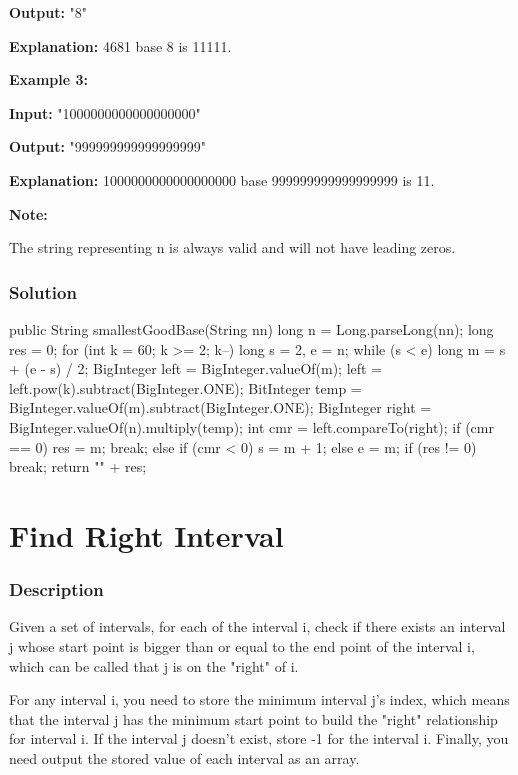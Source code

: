 \textbf{Output:} "8"

\textbf{Explanation:} 4681 base 8 is 11111.

\textbf{Example 3:}

\textbf{Input:} "1000000000000000000"

\textbf{Output:} "999999999999999999"

\textbf{Explanation:} 1000000000000000000 base 999999999999999999 is 11.

\textbf{Note:}

The string representing n is always valid and will not have leading zeros.
\subsubsection{Solution}

\begin{Code}
public String smallestGoodBase(String nn) {
    long n = Long.parseLong(nn);
    long res = 0;
    for (int k = 60; k >= 2; k--) {
        long s = 2, e = n;
        while (s < e) {
            long m = s + (e - s) / 2;
            BigInteger left = BigInteger.valueOf(m);
            left = left.pow(k).subtract(BigInteger.ONE);
            BitInteger temp = BigInteger.valueOf(m).subtract(BigInteger.ONE);
            BigInteger right = BigInteger.valueOf(n).multiply(temp);
            int cmr = left.compareTo(right);
            if (cmr == 0) {
                res = m;
                break;
            } else if (cmr < 0) {
                s = m + 1;
            } else {
                e = m;
            }
        }
        if (res != 0) break;
    }
    return "" + res;
}
\end{Code}

\newpage

\section{Find Right Interval} %

\subsubsection{Description}
Given a set of intervals, for each of the interval i, check if there exists an interval j whose start point is bigger than or equal to the end point of the interval i, which can be called that j is on the "right" of i.

For any interval i, you need to store the minimum interval j's index, which means that the interval j has the minimum start point to build the "right" relationship for interval i. If the interval j doesn't exist, store -1 for the interval i. Finally, you need output the stored value of each interval as an array.

